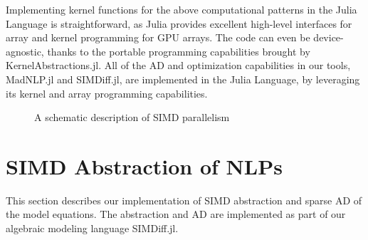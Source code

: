 Implementing kernel functions for the above computational patterns in
the Julia Language is straightforward, as Julia provides excellent
high-level interfaces for array and kernel programming for GPU
arrays. The code can even be device-agnostic, thanks to the portable
programming capabilities brought by KernelAbstractions.jl. All
of the AD and optimization capabilities in our
tools, MadNLP.jl and SIMDiff.jl, are implemented in the Julia Language,
by leveraging its kernel and array programming capabilities.

\begin{figure}[t]
  \centering
  \label{fig:simd}
  \caption{A schematic description of SIMD parallelism}
\end{figure}

\section{SIMD Abstraction of NLPs}\label{sec:simd}

This section describes our implementation of SIMD abstraction and
sparse AD of the model equations. The abstraction and AD are
implemented as part of our algebraic modeling language SIMDiff.jl.

